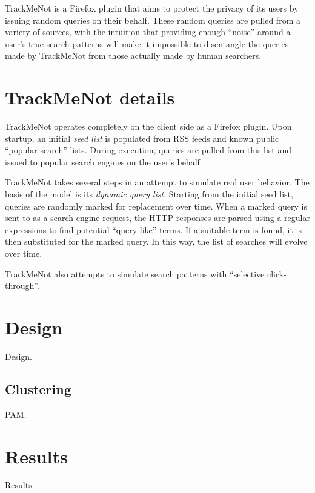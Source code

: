 \documentclass[11pt]{article}
\begin{document}
\begin{multicols}{2}
TrackMeNot is a Firefox plugin that aims to protect the privacy of its users by issuing random queries on their behalf. These random queries are pulled from a variety of sources, with the intuition that providing enough ``noise'' around a user's true search patterns will make it impossible to disentangle the queries made by TrackMeNot from those actually made by human searchers.

\section{TrackMeNot details}
\label{sec:tmn}
TrackMeNot operates completely on the client side as a Firefox plugin. Upon startup, an initial {\it seed list} is populated from RSS feeds and known public ``popular search'' lists. During execution, queries are pulled from this list and issued to popular search engines on the user's behalf.

TrackMeNot takes several steps in an attempt to simulate real user behavior. The basis of the model is its {\it dynamic query list}. Starting from the initial seed list, queries are randomly marked for replacement over time. When a marked query is sent to as a search engine request, the HTTP responses are parsed using a regular expressions to find potential ``query-like'' terms. If a suitable term is found, it is then substituted for the marked query. In this way, the list of searches will evolve over time.

TrackMeNot also attempts to simulate search patterns with ``selective click-through''. 

\section{Design}
\label{sec:design}
Design.

\subsection{Clustering}
\label{sec:clustering}
PAM.

\section{Results}
\label{sec:results}

Results. \cite{tmn}


\end{multicols}
\end{document}
